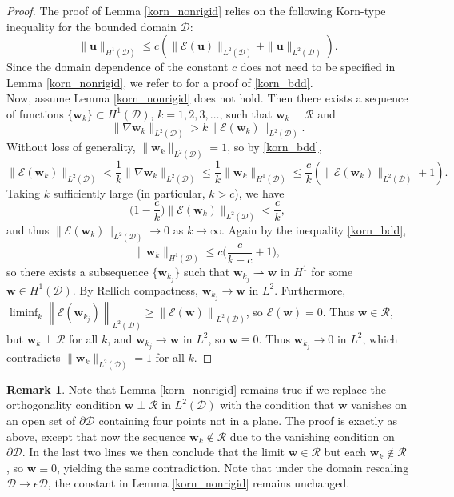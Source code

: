 \documentclass[11pt]{article}
\numberwithin{equation}{section}
\newcommand{\E}{\mathcal{E}}
\newcommand{\D}{\mathcal{D}}
\newcommand{\sR}{\mathcal{R}}
\newcommand{\bu}{\bm{u}}
\newcommand{\bw}{\bm{w}}
\newcommand{\p}{\partial}
\newcommand{\norm}[1]{\left\lVert #1 \right\rVert}
\theoremstyle{definition}
\newtheorem{remark}[theorem]{Remark}
\begin{document}
\begin{proof}
The proof of Lemma \ref{korn_nonrigid} relies on the following Korn-type inequality for the bounded domain $\D$: 
\begin{equation}\label{korn_bdd}
\|\bu\|_{H^1(\D)} \le c (\|\mathcal{E}(\bu)\|_{L^2(\D)}+\|\bu\|_{L^2(\D)}).
\end{equation}
Since the domain dependence of the constant $c$ does not need to be specified in Lemma \ref{korn_nonrigid}, we refer to \cite{duvaut1976inequalities} for a proof of \eqref{korn_bdd}. \\

Now, assume Lemma \ref{korn_nonrigid} does not hold. Then there exists a sequence of functions $\{\bw_k\}\subset H^1(\D)$, $k=1,2,3,\dots$, such that $\bw_k\perp \sR$ and 
\[ \|\nabla\bw_k\|_{L^2(\D)} > k \|\E(\bw_k)\|_{L^2(\D)}.\] 
Without loss of generality, $\|\bw_k\|_{L^2(\D)}=1$, so by \eqref{korn_bdd},
\[\|\E(\bw_k)\|_{L^2(\D)} < \frac{1}{k}\|\nabla\bw_k\|_{L^2(\D)} \le \frac{1}{k}\|\bw_k\|_{H^1(\D)} \le \frac{c}{k}(\|\E(\bw_k)\|_{L^2(\D)}+1).\]
Taking $k$ sufficiently large (in particular, $k>c$), we have 
\[ \bigg(1-\frac{c}{k}\bigg)\|\E(\bw_k)\|_{L^2(\D)} < \frac{c}{k},\]
and thus $\|\E(\bw_k)\|_{L^2(\D)}\to 0$ as $k\to\infty$. Again by the inequality \eqref{korn_bdd}, 
\[ \|\bw_k\|_{H^1(\D)} \le c\bigg(\frac{c}{k-c}+1\bigg), \]
so there exists a subsequence $\{\bw_{k_j}\}$ such that $\bw_{k_j}\rightharpoonup \bw$ in $H^1$ for some $\bw\in H^1(\D)$. By Rellich compactness, $\bw_{k_j} \to \bw$ in $L^2$. Furthermore, $\liminf_k \norm{\E(\bw_{k_j})}_{L^2(\D)}\ge \norm{\E(\bw)}_{L^2(\D)}$, so $\E(\bw)=0$. Thus $\bw\in \sR$, but $\bw_k\perp\sR$ for all $k$, and $\bw_{k_j} \to \bw$ in $L^2$, so $\bw\equiv 0$. Thus $\bw_{k_j} \to 0$ in $L^2$, which contradicts $\|\bw_k\|_{L^2(\D)}=1$ for all $k$.
\end{proof}

\begin{remark}\label{korn_rmk}
Note that Lemma \ref{korn_nonrigid} remains true if we replace the orthogonality condition $\bw\perp \sR$ in $L^2(\D)$ with the condition that $\bw$ vanishes on an open set of $\p\D$ containing four points not in a plane. The proof is exactly as above, except that now the sequence $\bw_k\not\in\sR$ due to the vanishing condition on $\p\D$. In the last two lines we then conclude that the limit $\bw\in \sR$ but each $\bw_k\not\in\sR$, so $\bw\equiv 0$, yielding the same contradiction. Note that under the domain rescaling $\D\to \epsilon\D$, the constant in Lemma \ref{korn_nonrigid} remains unchanged.
\end{remark}
\end{document}
